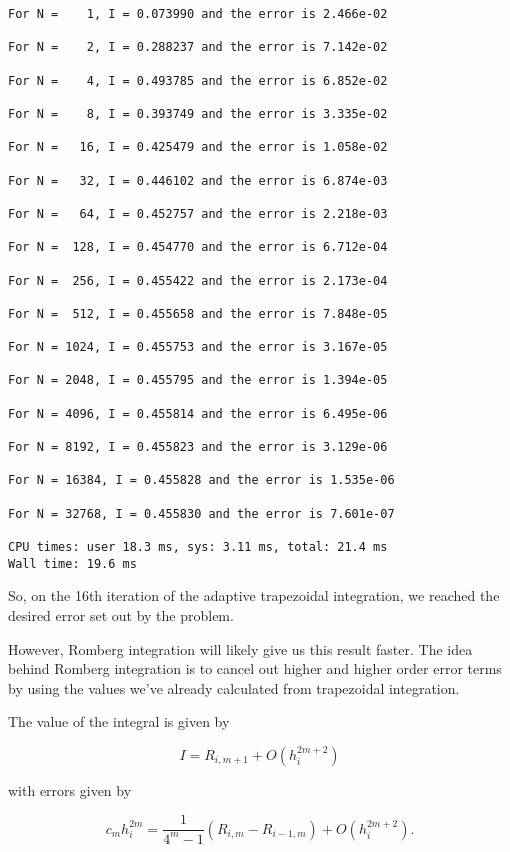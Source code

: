 \documentclass[11pt]{article}
\begin{document}
    \begin{Verbatim}[commandchars=\\\{\}]
For N =    1, I = 0.073990 and the error is 2.466e-02 

For N =    2, I = 0.288237 and the error is 7.142e-02 

For N =    4, I = 0.493785 and the error is 6.852e-02 

For N =    8, I = 0.393749 and the error is 3.335e-02 

For N =   16, I = 0.425479 and the error is 1.058e-02 

For N =   32, I = 0.446102 and the error is 6.874e-03 

For N =   64, I = 0.452757 and the error is 2.218e-03 

For N =  128, I = 0.454770 and the error is 6.712e-04 

For N =  256, I = 0.455422 and the error is 2.173e-04 

For N =  512, I = 0.455658 and the error is 7.848e-05 

For N = 1024, I = 0.455753 and the error is 3.167e-05 

For N = 2048, I = 0.455795 and the error is 1.394e-05 

For N = 4096, I = 0.455814 and the error is 6.495e-06 

For N = 8192, I = 0.455823 and the error is 3.129e-06 

For N = 16384, I = 0.455828 and the error is 1.535e-06 

For N = 32768, I = 0.455830 and the error is 7.601e-07 

CPU times: user 18.3 ms, sys: 3.11 ms, total: 21.4 ms
Wall time: 19.6 ms

    \end{Verbatim}

    So, on the 16th iteration of the adaptive trapezoidal integration, we
reached the desired error set out by the problem.

However, Romberg integration will likely give us this result faster. The
idea behind Romberg integration is to cancel out higher and higher order
error terms by using the values we've already calculated from
trapezoidal integration.

The value of the integral is given by

\[I = R_{i, m+1} + O(h_i^{2m+2})\]

with errors given by

\[c_mh_i^{2m} = \frac{1}{4^m -1} (R_{i,m} - R_{i-1, m}) + O(h_i^{2m+2}).\]
\end{document}
